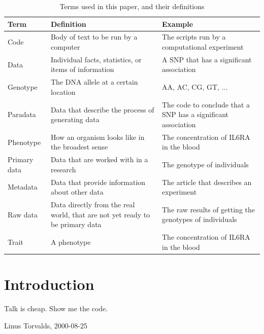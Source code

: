 \begin{table}[h]
  \begin{tabular}{lp{5cm}p{5cm}}
    Term      & Definition                                            & Example                                                         \\
    \hline
    Code      & Body of text to be run by a computer                  & The scripts run by a computational experiment                   \\
    Data      & Individual facts, statistics, or items of information & A SNP that has a significant association                        \\
    Genotype  & The DNA allele at a certain location                  & AA, AC, CG, GT, ...                                             \\
    Paradata  & Data that describe the process of generating data     & The code to conclude that a SNP has a significant association   \\
    Phenotype & How an organism looks like in the broadest sense      & The concentration of IL6RA in the blood                         \\
    Primary data & Data that are worked with in a research            & The genotype of individuals   \\
    Metadata  & Data that provide information about other data        & The article that describes an experiment                        \\
    Raw data  & Data directly from the real world, that are not yet ready to be primary data & The raw results of getting the genotypes of individuals   \\
    Trait     & A phenotype                                           & The concentration of IL6RA in the blood                         
  \end{tabular}
  \caption{Terms used in this paper, and their definitions}
  \label{tab:definitions}
\end{table}

\section{Introduction}

\epigraph{
  Talk is cheap. Show me the code.
}{
  Linus Torvalds, 2000-08-25
}

